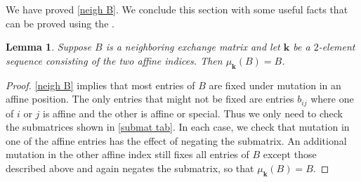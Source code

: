 \documentclass{amsart}
\newtheorem{lemma}[proposition]{Lemma}
\theoremstyle{definition}
\theoremstyle{remark}
\numberwithin{equation}{section}
\newcommand{\0}{{\mathbf{0}}}
\newcommand{\kk}{\mathbf{k}}
\begin{document}
We have proved \cref{neigh B}.
We conclude this section with some useful facts that can be proved using the .

\begin{lemma}\label{affine mut}
Suppose $B$ is a neighboring exchange matrix and let $\kk$ be a $2$-element sequence consisting of the two affine indices. 
Then $\mu_\kk(B)=B$.
\end{lemma}
\begin{proof}
\cref{neigh B} implies that most entries of $B$ are fixed under mutation in an affine position.
The only entries that might not be fixed are entries $b_{ij}$ where one of $i$ or $j$ is affine and the other is affine or special.
Thus we only need to check the submatrices shown in \cref{submat tab}.
In each case, we check that mutation in one of the affine entries has the effect of negating the submatrix.
An additional mutation in the other affine index still fixes all entries of $B$ except those described above and again negates the submatrix, so that $\mu_\kk(B)=B$.  

\end{proof}
\end{document}

